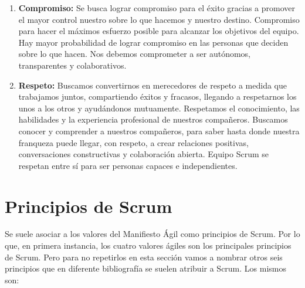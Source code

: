 \begin{enumerate}
\item \textbf{Compromiso:} Se busca lograr compromiso para el éxito gracias a promover el mayor control nuestro sobre lo que hacemos y nuestro destino. Compromiso para hacer el máximos esfuerzo posible para alcanzar los objetivos del equipo. Hay mayor probabilidad de lograr compromiso en las personas que deciden sobre lo que hacen. Nos debemos comprometer a ser autónomos, transparentes y colaborativos.

\item \textbf{Respeto:} Buscamos convertirnos en merecedores de respeto a medida que trabajamos juntos, compartiendo éxitos y fracasos, llegando a respetarnos los unos a los otros y ayudándonos mutuamente. Respetamos el conocimiento, las habilidades y la experiencia profesional de nuestros compañeros. Buscamos conocer y comprender a nuestros compañeros, para saber hasta donde nuestra franqueza puede llegar, con respeto, a crear relaciones positivas, conversaciones constructivas y colaboración abierta. Equipo Scrum se respetan entre sí para ser personas capaces e independientes.

\end{enumerate}

\section{Principios de Scrum}

Se suele asociar a los valores del Manifiesto Ágil como principios de Scrum. Por lo que, en primera instancia, los cuatro valores ágiles son los principales principios de Scrum. Pero para no repetirlos en esta sección vamos a nombrar otros seis principios que en diferente bibliografía se suelen atribuir a Scrum. Los mismos son:

